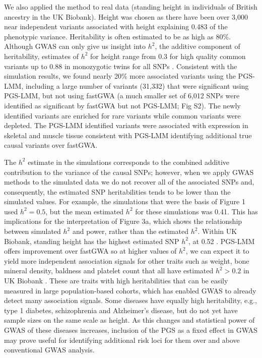 \documentclass[doublespacing]{bmcart}
\begin{document}
We also applied the method to real data (standing height in individuals of British ancestry in the UK Biobank). Height was chosen as there have been over 3,000 near independent variants associated with height explaining 0.483 of the phenotypic variance. Heritability is often estimated to be as high as 80\%. Although GWAS can only give us insight into $h^2$, the additive component of heritability, estimates of $h^2$ for height range from 0.3 for high quality common variants up to 0.88 in monozygotic twins for all SNPs \cite{yengo2018meta,hou2019accurate,nolte2017comparison}. Consistent with the simulation results, we found nearly 20\% more associated variants using the PGS-LMM, including a large number of variants (31,332) that were significant using PGS-LMM, but not using fastGWA (a much smaller set of 6,012 SNPs were identified as significant by fastGWA but not PGS-LMM; Fig S2). The newly identified variants are enriched for rare variants while common variants were depleted. The PGS-LMM identified variants were associated with expression in skeletal and muscle tissue consistent with PGS-LMM identifying additional true causal variants over fastGWA.  

The $h^2$ estimate in the simulations corresponds to the combined additive contribution to the variance of the causal SNPs; however, when we apply GWAS methods to the simulated data we do not recover all of the associated SNPs and, consequently, the estimated SNP heritabilities tends to be lower than the simulated values. For example, the simulations that were the basis of Figure 1 used $h^2 = 0.5$, but the mean estimated $h^2$ for these simulations was 0.41. This has implications for the interpretation of Figure 3a, which shows the relationship between simulated $h^2$ and power, rather than the estimated $h^2$.  Within UK Biobank, standing height has the highest estimated SNP $h^2$, at 0.52 \cite{jiang2019resource}.  PGS-LMM offers improvement over fastGWA so at higher values of $h^2$, we can expect it to yield more independent association signals for other traits such as weight, bone mineral density, baldness and platelet count that all have estimated $h^2 > 0.2$ in UK Biobank \cite{jiang2019resource}. These are traits with high heritabilities that can be easily measured in large population-based cohorts, which has enabled GWAS to already detect many association signals. Some diseases have equally high heritability, e.g., type 1 diabetes, schizophrenia and Alzheimer’s disease, but do not yet have sample sizes on the same scale as height. As this changes and statistical power of GWAS of these diseases increases, inclusion of the PGS as a fixed effect in GWAS may prove useful for identifying additional risk loci for them over and above conventional GWAS analysis. 
\end{document}
